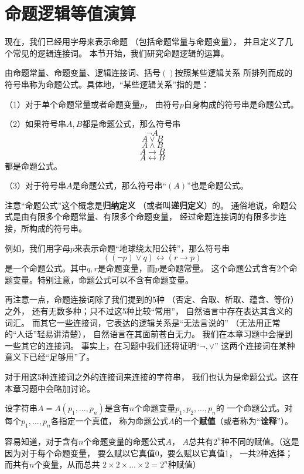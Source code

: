 \section{命题逻辑等值演算}
现在，我们已经用字母来表示命题
（包括命题常量与命题变量），
并且定义了几个常见的逻辑连接词。
本节开始，我们研究命题逻辑的运算。

\begin{definition}[命题公式]
由命题常量、命题变量、逻辑连接词、括号$()$按照某些逻辑关系
所排列而成的符号串称为命题公式。具体地，“某些逻辑关系”指的是：

（1）对于单个命题常量或者命题变量$p$，
由符号$p$自身构成的符号串是命题公式。

（2）如果符号串$A,B$都是命题公式，那么符号串
$$\neg A$$
$$A\vee B$$
$$A\wedge B$$
$$A\rightarrow B$$
$$A\leftrightarrow B$$
都是命题公式。

（3）对于符号串$A$是命题公式，那么符号串“$(A)$”也是命题公式。
\label{命题公式的概念}
\end{definition}

注意“命题公式”这个概念是\textbf{归纳定义}
（或者叫\textbf{递归定义}）的。
通俗地说，命题公式是由有限多个命题常量、有限多个命题变量，
经过命题连接词的有限多步连接，所构成的符号串。

例如，我们用字母$p$来表示命题“地球绕太阳公转”，那么符号串
$$((\neg p)\vee q)\leftrightarrow(r\rightarrow p)$$
是一个命题公式。其中$q,r$是命题变量，而$p$是命题常量。
这个命题公式含有2个命题变量。特别注意，命题公式可以不含有命题变量。

再注意一点，命题连接词除了我们提到的5种
（否定、合取、析取、蕴含、等价）之外，
还有无数多种；只不过这5种比较“常用”，
自然语言中存在表达其含义的词汇。
而其它一些连接词，它表达的逻辑关系是“无法言说的”
（无法用正常的“人话”轻易讲清楚），
自然语言在其面前苍白无力。
我们在本章习题中会提到一些其它的连接词。
事实上，在习题中我们还将证明“$\neg,\vee$”
这两个连接词在某种意义下已经“足够用”了。

对于用这5种连接词之外的连接词来连接的字符串，
我们也认为是命题公式。这在本章习题中会略加讨论。

\begin{definition}[命题公式的赋值]
设字符串$A=A(p_1,...,p_n)$是含有$n$个命题变量$p_1,p_2,...,p_n$的
一个命题公式。对每个$p_1,...,p_n$各指定一个真值，
称为命题公式$A$的一个\textbf{赋值}（或者称为“\textbf{诠释}”）。
\end{definition}

容易知道，对于含有$n$个命题变量的命题公式$A$，
$A$总共有$2^n$种不同的赋值。（这是因为对于每个命题变量，
要么赋以它真值0，要么赋以它真值1，
一共2种选择；而共有$n$个变量，从而总共
$2\times 2\times...\times2=2^n$种赋值）

